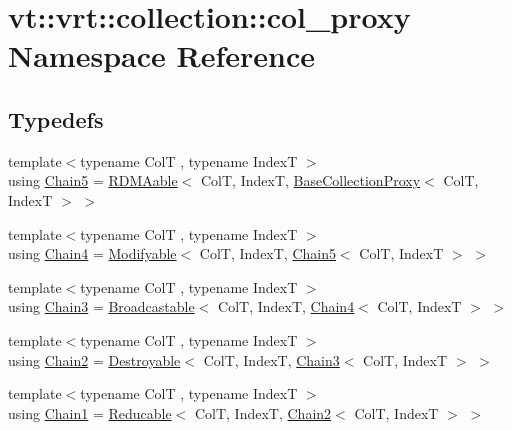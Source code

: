 \hypertarget{namespacevt_1_1vrt_1_1collection_1_1col__proxy}{}\section{vt\+:\+:vrt\+:\+:collection\+:\+:col\+\_\+proxy Namespace Reference}
\label{namespacevt_1_1vrt_1_1collection_1_1col__proxy}
\subsection*{Typedefs}
\begin{DoxyCompactItemize}
\item 
{\footnotesize template$<$typename ColT , typename IndexT $>$ }\\using \hyperlink{namespacevt_1_1vrt_1_1collection_1_1col__proxy_a96685f5884d57269c5c7dfe14dcc361b}{Chain5} = \hyperlink{structvt_1_1vrt_1_1collection_1_1_r_d_m_aable}{R\+D\+M\+Aable}$<$ ColT, IndexT, \hyperlink{structvt_1_1vrt_1_1collection_1_1_base_collection_proxy}{Base\+Collection\+Proxy}$<$ ColT, IndexT $>$ $>$
\item 
{\footnotesize template$<$typename ColT , typename IndexT $>$ }\\using \hyperlink{namespacevt_1_1vrt_1_1collection_1_1col__proxy_a41979c822dde46dfe2e2b9329f749a51}{Chain4} = \hyperlink{structvt_1_1vrt_1_1collection_1_1_modifyable}{Modifyable}$<$ ColT, IndexT, \hyperlink{namespacevt_1_1vrt_1_1collection_1_1col__proxy_a96685f5884d57269c5c7dfe14dcc361b}{Chain5}$<$ ColT, IndexT $>$ $>$
\item 
{\footnotesize template$<$typename ColT , typename IndexT $>$ }\\using \hyperlink{namespacevt_1_1vrt_1_1collection_1_1col__proxy_aa83ea97afbf21f975d02b933af0ee42c}{Chain3} = \hyperlink{structvt_1_1vrt_1_1collection_1_1_broadcastable}{Broadcastable}$<$ ColT, IndexT, \hyperlink{namespacevt_1_1vrt_1_1collection_1_1col__proxy_a41979c822dde46dfe2e2b9329f749a51}{Chain4}$<$ ColT, IndexT $>$ $>$
\item 
{\footnotesize template$<$typename ColT , typename IndexT $>$ }\\using \hyperlink{namespacevt_1_1vrt_1_1collection_1_1col__proxy_a0c21e18852e5deea513629fe02399bb5}{Chain2} = \hyperlink{structvt_1_1vrt_1_1collection_1_1_destroyable}{Destroyable}$<$ ColT, IndexT, \hyperlink{namespacevt_1_1vrt_1_1collection_1_1col__proxy_aa83ea97afbf21f975d02b933af0ee42c}{Chain3}$<$ ColT, IndexT $>$ $>$
\item 
{\footnotesize template$<$typename ColT , typename IndexT $>$ }\\using \hyperlink{namespacevt_1_1vrt_1_1collection_1_1col__proxy_a829dc1f247cb9518d83ccfb6ca9158a9}{Chain1} = \hyperlink{structvt_1_1vrt_1_1collection_1_1_reducable}{Reducable}$<$ ColT, IndexT, \hyperlink{namespacevt_1_1vrt_1_1collection_1_1col__proxy_a0c21e18852e5deea513629fe02399bb5}{Chain2}$<$ ColT, IndexT $>$ $>$
\end{DoxyCompactItemize}


